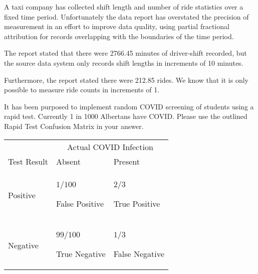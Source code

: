 \documentclass{exam}
\begin{document}
\begin{questions}
    \newpage
    \question A taxi company has collected shift length and number of ride statistics over
    a fixed time period. Unfortunately the data report has overstated the precision of
    measurement in an effort to improve data quality, using partial fractional attribution
    for records overlapping with the boundaries of the time period.

    The report stated that there were 2766.45 minutes of driver-shift recorded, but the
    source data system only records shift lengths in increments of 10 minutes.
    
    Furthermore, the report stated there were 212.85 rides. We know that it is only possible
    to measure ride counts in increments of 1.

    \newpage
    \question It has been purposed to implement random COVID screening of students using a
    rapid test. Currently 1 in 1000 Albertans have COVID. Please use the outlined Rapid Test
    Confusion Matrix in your answer.
    \begin{longtable}{lp{3cm}p{3cm}}
        & \multicolumn{2}{c}{Actual COVID Infection} \\
        Test Result & Absent & Present\\
        \hline
        \endhead\\
        Positive & $1/100$ \par False Positive & $2/3$ \par True Positive\\\\
        Negative & $99/100$ \par True Negative & $1/3$ \par False Negative
    \end{longtable}
    \begin{parts}

\end{parts}
\end{questions}
\end{document}
